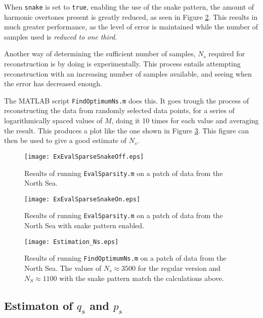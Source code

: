 \documentclass[Main]{subfiles}
\begin{document}
		When \texttt{snake} is set to \texttt{true}, enabling the use of the snake pattern, the amount of harmonic overtones present is greatly reduced, as seen in Figure \ref{fig:ExEvalSparseSnakeOn}.
		This results in much greater performance, as the level of error is maintained while the number of samples used is \emph{reduced to one third}. 

		Another way of determining the sufficient number of samples, $N_s$ required for reconstruction is by doing is experimentally.
		This process entails attempting reconstruction with an increasing number of samples available, and seeing when the error has decreased enough.

		The MATLAB script \texttt{FindOptimumNs.m} does this.
		It goes trough the process of reconstructing the data from randomly selected data points, for a series of logarithmically spaced values of $M$, doing it 10 times for each value and averaging the result.
		This produces a plot like the one shown in Figure \ref{fig:Estimation_Ns}.
		This figure can then be used to give a good estimate of $N_s$.

		\begin{figure}[H]
			\centering 
			\texttt{[image: ExEvalSparseSnakeOff.eps]}
			\caption{
				Results of running \texttt{EvalSparsity.m} on a patch of data from the North Sea.}
			\label{fig:ExEvalSparseSnakeOff}
		\end{figure}

		\begin{figure}[H]
			\centering 
			\texttt{[image: ExEvalSparseSnakeOn.eps]}
			\caption{
				Results of running \texttt{EvalSparsity.m} on a patch of data from the North Sea with snake pattern enabled.}
			\label{fig:ExEvalSparseSnakeOn}
		\end{figure}

		\begin{figure}[H]
			\centering 
			\texttt{[image: Estimation\_Ns.eps]}
			\caption{
				Results of running \texttt{FindOptimumNs.m} on a patch of data from the North Sea. The values of $N_s \approx 3500$ for the regular version and $N_S \approx 1100$ with the snake pattern match the calculations above.}
			\label{fig:Estimation_Ns}
		\end{figure}



	

	\subsection{Estimaton of $q_s$ and $p_s$} %
	\label{sub:estimaton_of_q_s_and_p_s}
\end{document}
